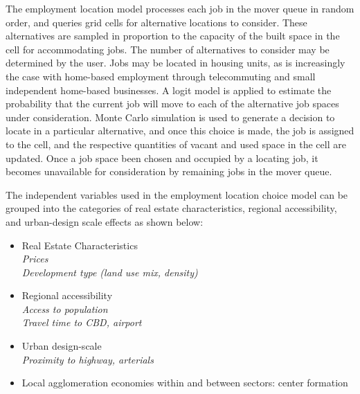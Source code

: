 \documentclass[fleqn]{article}
\begin{document}
The employment location model processes each job in the mover
queue in random order, and queries grid cells for alternative
locations to consider. These alternatives are sampled in
proportion to the capacity of the built space in the cell for
accommodating jobs.  The number of alternatives to consider may
be determined by the user.  Jobs may be located in
housing units, as is increasingly the case with home-based
employment through telecommuting and small independent home-based
businesses.  A logit model is applied to estimate the probability
that the current job will move to each of the alternative job
spaces under consideration.  Monte Carlo simulation is used to
generate a decision to locate in a particular alternative, and
once this choice is made, the job is assigned to the cell, and the
respective quantities of vacant and used space in the cell are
updated.  Once a job space been chosen and occupied by a
locating job, it becomes unavailable for consideration by remaining
jobs in the mover queue.

The independent variables used in the employment location choice
model can be grouped into the categories of real estate
characteristics, regional accessibility, and urban-design scale
effects as shown below:

\begin{itemize}

\item Real Estate Characteristics \\
\hspace*{2 mm} \emph{Prices} \\
\hspace*{2 mm} \emph{Development type (land use mix, density)}

\item Regional accessibility \\
\hspace*{2 mm} \emph{Access to population} \\
\hspace*{2 mm} \emph{Travel time to CBD, airport}

\item Urban design-scale \\
\hspace*{2 mm} \emph{Proximity to highway, arterials}

\item Local agglomeration economies within and between sectors: center
formation

\end{itemize}
\end{document}
